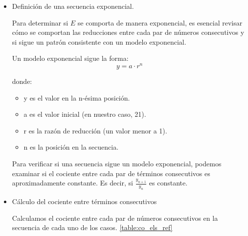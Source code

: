 \begin{itemize}
    \item Definición de una secuencia exponencial.

    Para determinar si $E$ se comporta de manera exponencial, es esencial revisar cómo se comportan las reducciones entre cada par de números consecutivos y si sigue un patrón consistente con un modelo exponencial.

    Un modelo exponencial sigue la forma:
    $$y = a \cdot r^n$$
     
    donde:
    
    \begin{itemize}
        \item y es el valor en la n-ésima posición.
        \item a es el valor inicial (en nuestro caso, 21).
        \item r es la razón de reducción (un valor menor a 1).
        \item n es la posición en la secuencia.
    \end{itemize}
    
    Para verificar si una secuencia sigue un modelo exponencial, podemos examinar si el cociente entre cada par de términos consecutivos es aproximadamente constante. Es decir, si $\frac{y_{n+1}}{y_n}$ es constante.

    \item Cálculo del cociente entre términos consecutivos

    Calculamos el cociente entre cada par de números consecutivos en la secuencia de cada uno de los casos. \autoref{table:co_els_ref}


\end{itemize}
